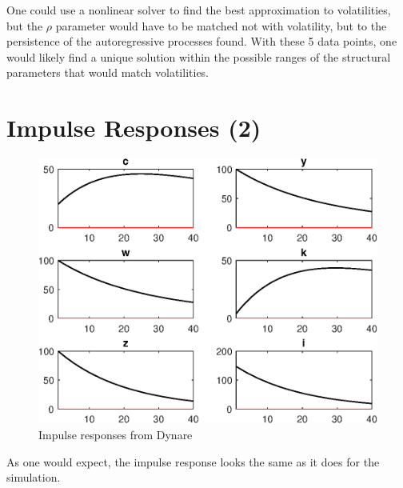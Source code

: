 \documentclass[11pt]{amsart}
\begin{document}
One could use a nonlinear solver to find the best approximation to volatilities, but the $\rho$ parameter would have to be matched not with volatility, but to the persistence of the autoregressive processes found. With these 5 data points, one would likely find a unique solution within the possible ranges of the structural parameters that would match volatilities.

\section{Impulse Responses (2)}

\begin{figure}[]
	\centering
	\includegraphics[width=1\textwidth]{Ken_files/ECON210C_PS2_dynare_IRF_e.eps}
	\caption{Impulse responses from Dynare}
\end{figure}

As one would expect, the impulse response looks the same as it does for the simulation.
\end{document}
